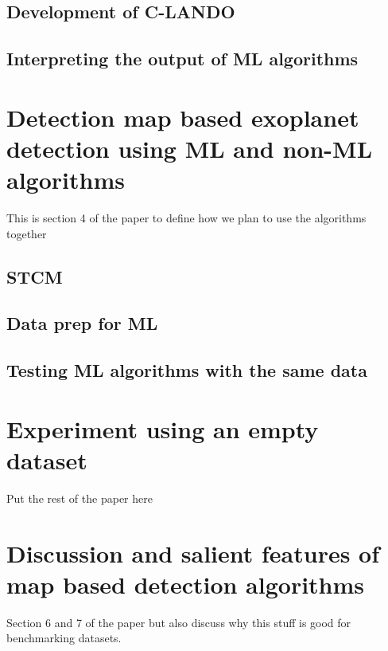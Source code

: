 \section{Development of C-LANDO}
\section{Interpreting the output of ML algorithms}

\chapter{Detection map based exoplanet detection using ML and non-ML algorithms}
This is section 4 of the paper to define how we plan to use the algorithms together
\section{STCM}
\section{Data prep for ML}
\section{Testing ML algorithms with the same data}

\chapter{Experiment using an empty dataset}
Put the rest of the paper here
\chapter{Discussion and salient features of map based detection algorithms}
Section 6 and 7 of the paper but also discuss why this stuff is good for benchmarking datasets.
